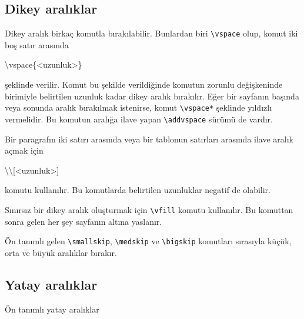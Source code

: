 \documentclass[
  letterpaper,
  DIV=11,
  numbers=noendperiod]{scrreprt}
\newenvironment{Shaded}{\begin{snugshade}}{\end{snugshade}}
\newcommand{\FunctionTok}[1]{\textcolor[rgb]{0.28,0.35,0.67}{#1}}
\newcommand{\NormalTok}[1]{\textcolor[rgb]{0.00,0.23,0.31}{#1}}
\begin{document}
\hypertarget{dikey-aralux131klar}{%
\subsection{Dikey aralıklar}\label{dikey-aralux131klar}}

Dikey aralık birkaç komutla bırakılabilir. Bunlardan biri
\texttt{\textbackslash{}vspace} olup, komut iki boş satır arasında

\begin{Shaded}
\begin{Highlighting}[]
\FunctionTok{\textbackslash{}vspace}\NormalTok{\{\textless{}uzunluk\textgreater{}\}}
\end{Highlighting}
\end{Shaded}

şeklinde verilir. Komut bu şekilde verildiğinde komutun zorunlu
değişkeninde birimiyle belirtilen uzunluk kadar dikey aralık bırakılır.
Eğer bir sayfanın başında veya sonunda aralık bırakılmak istenirse,
komut \texttt{\textbackslash{}vspace*} şeklinde yıldızlı vermelidir. Bu
komutun aralığa ilave yapan \texttt{\textbackslash{}addvspace} sürümü de
vardır.

Bir paragrafın iki satırı arasında veya bir tablonun satırları arasında
ilave aralık açmak için

\begin{Shaded}
\begin{Highlighting}[]
\FunctionTok{\textbackslash{}\textbackslash{}}\NormalTok{[\textless{}uzunluk\textgreater{}]}
\end{Highlighting}
\end{Shaded}

komutu kullanılır. Bu komutlarda belirtilen uzunluklar negatif de
olabilir.

Sınırsız bir dikey aralık oluşturmak için \texttt{\textbackslash{}vfill}
komutu kullanılır. Bu komuttan sonra gelen her şey sayfanın altına
yaslanır.

Ön tanımlı gelen \texttt{\textbackslash{}smallskip},
\texttt{\textbackslash{}medskip} ve \texttt{\textbackslash{}bigskip}
komutları sırasıyla küçük, orta ve büyük aralıklar bırakır.

\hypertarget{yatay-aralux131klar}{%
\subsection{Yatay aralıklar}\label{yatay-aralux131klar}}

Ön tanımlı yatay aralıklar
\end{document}
